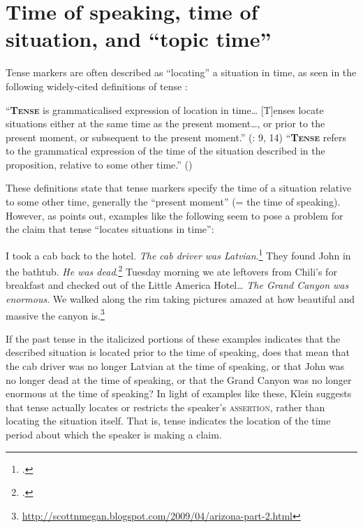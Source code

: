 \section{Time of speaking, time of situation, and “topic time”}\label{sec:20.3}

Tense markers are often described as “locating” a situation in time, as seen in the following widely-cited definitions of tense :


\ea \label{ex:20.10}
\ea   “\textbf{\textsc{Tense}} is grammaticalised expression of location in time… [T]enses locate situations either at the same time as the present moment…, or prior to the present moment, or subsequent to the present moment.” (\citealt{Comrie1985}: 9, 14)
\ex  “\textbf{\textsc{Tense}} refers to the grammatical expression of the time of the situation described in the proposition, relative to some other time.” (\citealt[144]{Bybee1992})
\z \z


These definitions state that tense markers specify the time of a situation relative to some other time, generally the “present moment” (= the time of speaking). However, as \citet{Klein1994} points out, examples like the following seem to pose a problem for the claim that tense “locates situations in time”:


\ea \label{ex:20.11}
\ea   I took a cab back to the hotel. \textit{The cab driver was Latvian}.\footnote{\citet{Michaelis2006}.}
\ex They found John in the bathtub. \textit{He was dead}.\footnote{\citet[22]{Klein1994}.}
\ex  Tuesday morning we ate leftovers from Chili’s for breakfast and checked out of the Little America Hotel… \textit{The Grand Canyon was enormous}. We walked along the rim taking pictures amazed at how beautiful and massive the canyon is.\footnote{\url{http://scottnmegan.blogspot.com/2009/04/arizona-part-2.html}}
\z \z


If the past tense in the italicized portions of these examples indicates that the described situation is located prior to the time of speaking, does that mean that the cab driver was no longer {Latvian} at the time of speaking, or that John was no longer dead at the time of speaking, or that the Grand Canyon was no longer enormous at the time of speaking? In light of examples like these, Klein suggests that tense actually locates or restricts the speaker’s \textsc{assertion}, rather than locating the situation itself. That is, tense indicates the location of the time period about which the speaker is making a claim.



